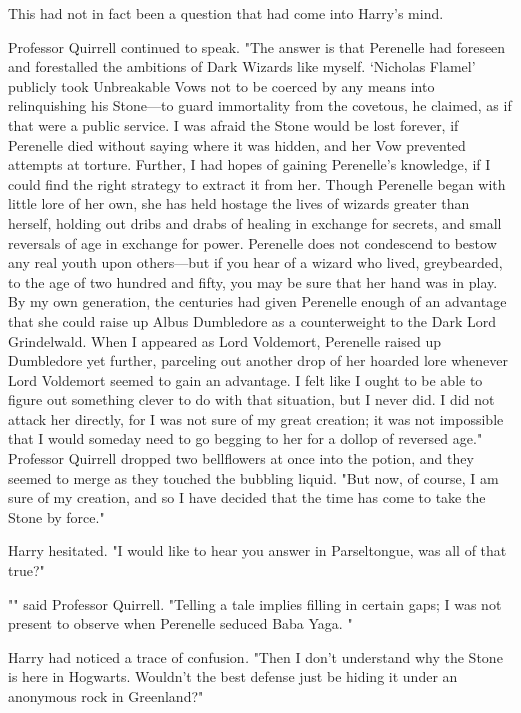 This had not in fact been a question that had come into Harry's mind.

Professor Quirrell continued to speak. "The answer is that Perenelle had 
foreseen and forestalled the ambitions of Dark Wizards like myself. `Nicholas 
Flamel' publicly took Unbreakable Vows not to be coerced by any means into 
relinquishing his Stone---to guard immortality from the covetous, he claimed, 
as if that were a public service. I was afraid the Stone would be lost forever, 
if Perenelle died without saying where it was hidden, and her Vow prevented 
attempts at torture. Further, I had hopes of gaining Perenelle's knowledge, if 
I could find the right strategy to extract it from her. Though Perenelle began 
with little lore of her own, she has held hostage the lives of wizards greater 
than herself, holding out dribs and drabs of healing in exchange for secrets, 
and small reversals of age in exchange for power. Perenelle does not condescend 
to bestow any real youth upon others---but if you hear of a wizard who lived, 
greybearded, to the age of two hundred and fifty, you may be sure that her hand 
was in play. By my own generation, the centuries had given Perenelle enough of 
an advantage that she could raise up Albus Dumbledore as a counterweight to the 
Dark Lord Grindelwald. When I appeared as Lord Voldemort, Perenelle raised up 
Dumbledore yet further, parceling out another drop of her hoarded lore whenever 
Lord Voldemort seemed to gain an advantage. I felt like I ought to be able to 
figure out something clever to do with that situation, but I never did. I did 
not attack her directly, for I was not sure of my great creation; it was not 
impossible that I would someday need to go begging to her for a dollop of 
reversed age." Professor Quirrell dropped two bellflowers at once into the 
potion, and they seemed to merge as they touched the bubbling liquid. "But now, 
of course, I am sure of my creation, and so I have decided that the time has 
come to take the Stone by force."

Harry hesitated. "I would like to hear you answer in Parseltongue, was all of 
that true?"

"" said Professor Quirrell. 
"Telling a tale implies filling in certain gaps; I was not present to observe 
when Perenelle seduced Baba Yaga. "

Harry had noticed a trace of confusion\emph{.} "Then I don't understand why the 
Stone is here in Hogwarts. Wouldn't the best defense just be hiding it under an 
anonymous rock in Greenland?"

